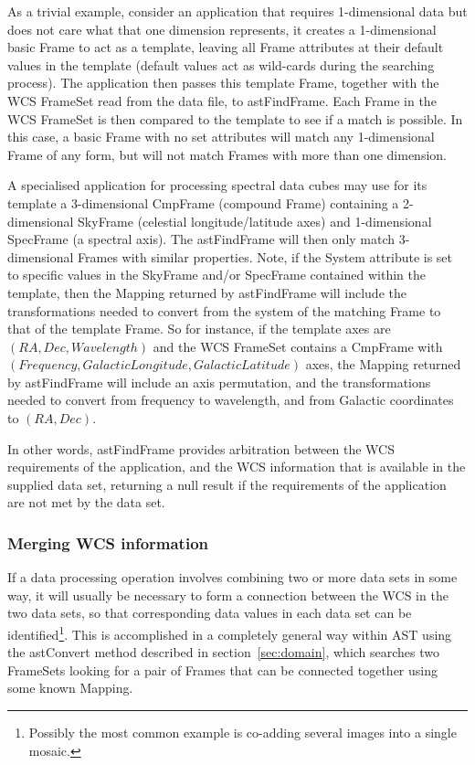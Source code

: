 \documentclass[final,authoryear,5p,times,twocolumn]{elsarticle}
\begin{document}
As a trivial example, consider an application that requires 1-dimensional
data but does not care what that one dimension represents, it creates a
1-dimensional basic Frame to act as a template, leaving all Frame
attributes at their default values in the template (default values act as
wild-cards during the searching process). The application then passes
this template Frame, together with the WCS FrameSet read from the data
file, to astFindFrame. Each Frame in the WCS FrameSet is then compared to
the template to see if a match is possible. In this case, a basic Frame
with no set attributes will match any 1-dimensional Frame of any form,
but will not match Frames with more than one dimension.

A specialised application for processing spectral data cubes may use for
its template a 3-dimensional CmpFrame (compound Frame) containing a
2-dimensional SkyFrame (celestial longitude/latitude axes) and
1-dimensional SpecFrame (a spectral axis). The astFindFrame will then
only match 3-dimensional Frames with similar properties. Note, if the
System attribute is set to specific values in the SkyFrame and/or
SpecFrame contained within the template, then the Mapping returned by
astFindFrame will include the transformations needed to convert from the
system of the matching Frame to that of the template Frame. So for
instance, if the template axes are $(RA,Dec,Wavelength)$ and the WCS
FrameSet contains a CmpFrame with $(Frequency,GalacticLongitude,
GalacticLatitude)$ axes, the Mapping returned by astFindFrame will include an
axis permutation, and the transformations needed to convert from frequency
to wavelength, and from Galactic coordinates to $(RA,Dec)$.

In other words, astFindFrame provides arbitration between the WCS
requirements of the application, and the WCS information that is available
in the supplied data set, returning a null result if the requirements of
the application are not met by the data set.

\subsubsection{Merging WCS information}

If a data processing operation involves combining two or more data sets
in some way, it will usually be necessary to form a connection between
the WCS in the two data sets, so that corresponding data values in each
data set can be identified\footnote{Possibly the most common example is
co-adding several images into a single mosaic.}. This is accomplished in
a completely general way within AST using the astConvert method
described in section~\ref{sec:domain}, which searches two FrameSets
looking for a pair of Frames that can be connected together using some
known Mapping.
\end{document}
